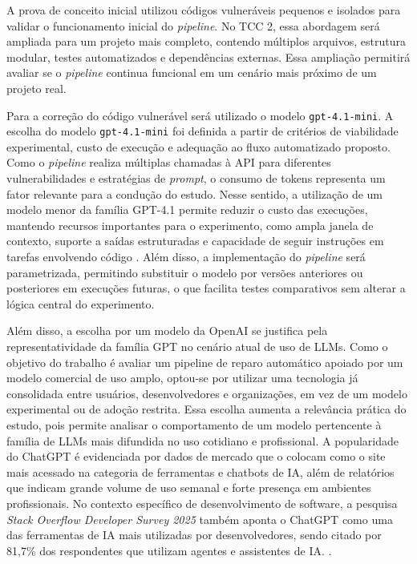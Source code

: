 A prova de conceito inicial utilizou códigos vulneráveis pequenos e isolados para validar o funcionamento inicial do \textit{pipeline}. No TCC 2, essa abordagem será ampliada para um projeto   mais completo, contendo múltiplos arquivos, estrutura modular, testes automatizados e dependências externas. Essa ampliação permitirá avaliar se o \textit{pipeline} continua funcional em um cenário mais próximo de um projeto real.

Para a correção do código vulnerável será utilizado o modelo \texttt{gpt-4.1-mini}. A escolha do modelo \texttt{gpt-4.1-mini} foi definida a partir de critérios de viabilidade experimental, custo de execução e adequação ao fluxo automatizado proposto. Como o \textit{pipeline} realiza múltiplas chamadas à API para diferentes vulnerabilidades e estratégias de \textit{prompt}, o consumo de tokens representa um fator relevante para a condução do estudo. Nesse sentido, a utilização de um modelo menor da família GPT-4.1 permite reduzir o custo das execuções, mantendo recursos importantes para o experimento, como ampla janela de contexto, suporte a saídas estruturadas e capacidade de seguir instruções em tarefas envolvendo código \cite{openai_gpt41mini}. Além disso, a implementação do \textit{pipeline} será parametrizada, permitindo substituir o modelo por versões anteriores ou posteriores em execuções futuras, o que facilita testes comparativos sem alterar a lógica central do experimento.

Além disso, a escolha por um modelo da OpenAI se justifica pela representatividade da família GPT no cenário atual de uso de LLMs. Como o objetivo do trabalho é avaliar um pipeline de reparo automático apoiado por um modelo comercial de uso amplo, optou-se por utilizar uma tecnologia já consolidada entre usuários, desenvolvedores e organizações, em vez de um modelo experimental ou de adoção restrita. Essa escolha aumenta a relevância prática do estudo, pois permite analisar o comportamento de um modelo pertencente à família de LLMs mais difundida no uso cotidiano e profissional. A popularidade do ChatGPT é evidenciada por dados de mercado que o colocam como o site mais acessado na categoria de ferramentas e chatbots de IA, além de relatórios que indicam grande volume de uso semanal e forte presença em ambientes profissionais. No contexto específico de desenvolvimento de software, a pesquisa \textit{Stack Overflow Developer Survey 2025} também aponta o ChatGPT como uma das ferramentas de IA mais utilizadas por desenvolvedores, sendo citado por 81,7\% dos respondentes que utilizam agentes e assistentes de IA. \cite{similarweb_ai_chatbots_2026,stackoverflow_survey_ai_2025}.



